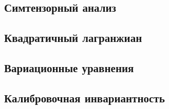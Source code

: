 \documentclass[\docroot/reports/draft/report.tex]{subfiles}
\begin{document}
\onlyinsubfile{\tableofcontents}

\subsection{Симтензорный анализ}


\subsection{Квадратичный лагранжиан}


\subsection{Вариационные уравнения}


\subsection{Калибровочная инвариантность}


\end{document}
